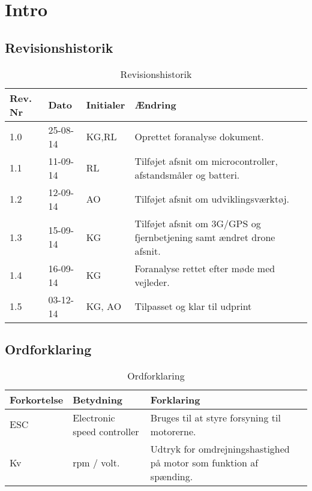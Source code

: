 \chapter{Intro}

\section{Revisionshistorik}
\begin{table}[H]
	\centering
		\begin{tabular}{|p{2 cm}|p{2 cm}|p{2 cm}|p{7 cm}|} 
		\hline
			\textbf{Rev. Nr} & \textbf{Dato}		& \textbf{Initialer} 	& \textbf{Ændring} \\ \hline
			1.0 	& 25-08-14	& KG,RL		& Oprettet foranalyse dokument.	\\ \hline
			1.1 	& 11-09-14	& RL		& Tilføjet afsnit om microcontroller, afstandsmåler og batteri.	\\ \hline
			1.2 	& 12-09-14	& AO		& Tilføjet afsnit om udviklingsværktøj.	\\ \hline	
			1.3 	& 15-09-14	& KG		& Tilføjet afsnit om 3G/GPS og fjernbetjening samt ændret drone afsnit.	\\ \hline
			1.4 	& 16-09-14	& KG		& Foranalyse rettet efter møde med vejleder.	\\ \hline
			1.5 	& 03-12-14	& KG, AO	& Tilpasset og klar til udprint	\\ \hline
		\end{tabular}
	\caption{Revisionshistorik}
\end{table}

\vspace{.5cm}

\section{Ordforklaring}
\begin{table}[H]
	\centering
		\begin{tabular}{|p{2.5cm}|p{4.5 cm}|p{6.5 cm}|} 
		\hline
			\textbf{Forkortelse} & \textbf{Betydning} & \textbf{Forklaring} \\ \hline
			ESC & Electronic speed controller & Bruges til at styre forsyning til motorerne. \\ \hline
			Kv & rpm / volt. & Udtryk for omdrejningshastighed på motor som funktion af spænding. \\ \hline
		\end{tabular}
	\caption{Ordforklaring}
\end{table}



